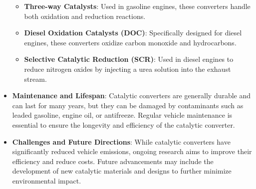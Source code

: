 \documentclass[11pt]{article}
\begin{document}
\begin{itemize}
\begin{itemize}
        \item \textbf{Three-way Catalysts}: Used in gasoline engines, these converters handle both oxidation and reduction reactions.
        \item \textbf{Diesel Oxidation Catalysts (DOC)}: Specifically designed for diesel engines, these converters oxidize carbon monoxide and hydrocarbons.
        \item \textbf{Selective Catalytic Reduction (SCR)}: Used in diesel engines to reduce nitrogen oxides by injecting a urea solution into the exhaust stream.
    \end{itemize}
    \item \textbf{Maintenance and Lifespan}: Catalytic converters are generally durable and can last for many years, but they can be damaged by contaminants such as leaded gasoline, engine oil, or antifreeze. Regular vehicle maintenance is essential to ensure the longevity and efficiency of the catalytic converter.
    \item \textbf{Challenges and Future Directions}: While catalytic converters have significantly reduced vehicle emissions, ongoing research aims to improve their efficiency and reduce costs. Future advancements may include the development of new catalytic materials and designs to further minimize environmental impact.
\end{itemize}
\end{document}
